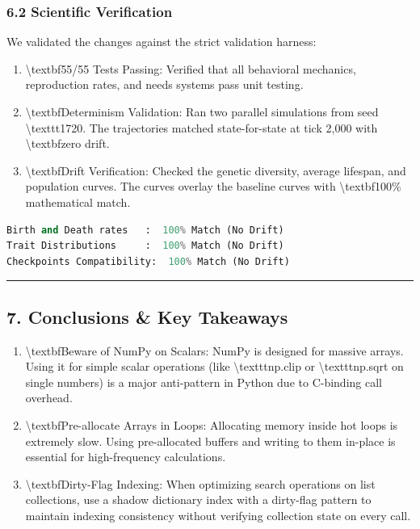 \documentclass[11pt,a4paper]{article}
\begin{document}
\subsubsection*{6.2 Scientific Verification}
We validated the changes against the strict validation harness:
\begin{enumerate}
  \item \textbackslash{}textbf{55/55 Tests Passing:} Verified that all behavioral mechanics, reproduction rates, and needs systems pass unit testing.
  \item \textbackslash{}textbf{Determinism Validation:} Ran two parallel simulations from seed \textbackslash{}texttt{1720}. The trajectories matched state-for-state at tick 2,000 with \textbackslash{}textbf{zero drift}.
  \item \textbackslash{}textbf{Drift Verification:} Checked the genetic diversity, average lifespan, and population curves. The curves overlay the baseline curves with \textbackslash{}textbf{100\% mathematical match}.
\end{enumerate}

\begin{lstlisting}[language=Python]
Birth and Death rates   :  100% Match (No Drift)
Trait Distributions     :  100% Match (No Drift)
Checkpoints Compatibility:  100% Match (No Drift)
\end{lstlisting}

\noindent\rule{\textwidth}{0.4pt}

\subsection*{7. Conclusions \& Key Takeaways}

\begin{enumerate}
  \item \textbackslash{}textbf{Beware of NumPy on Scalars:} NumPy is designed for massive arrays. Using it for simple scalar operations (like \textbackslash{}texttt{np.clip} or \textbackslash{}texttt{np.sqrt} on single numbers) is a major anti-pattern in Python due to C-binding call overhead.
  \item \textbackslash{}textbf{Pre-allocate Arrays in Loops:} Allocating memory inside hot loops is extremely slow. Using pre-allocated buffers and writing to them in-place is essential for high-frequency calculations.
  \item \textbackslash{}textbf{Dirty-Flag Indexing:} When optimizing search operations on list collections, use a shadow dictionary index with a dirty-flag pattern to maintain indexing consistency without verifying collection state on every call.
\end{enumerate}
\end{document}
